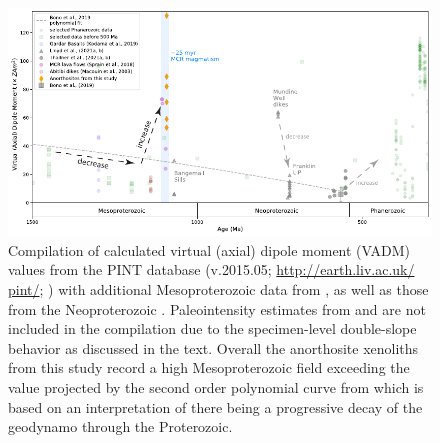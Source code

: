 \documentclass[9pt,twocolumn,twoside,lineno]{pnas-new}
\begin{document}
\begin{figure}[h!]
\noindent\includegraphics[width=17.8 cm]{PINT_compilation.pdf}
\centering
\caption{\footnotesize{Compilation of calculated virtual (axial) dipole moment (VADM) values from the PINT database (v.2015.05; \url{http://earth.liv.ac.uk/ pint/}; \cite{Biggin2015a}) with additional Mesoproterozoic data from \cite{Sprain2018a, Kodama2019a}, as well as those from the Neoproterozoic \cite{Lloyd2021a, Lloyd2021b, Thallner2021a, Thallner2021b}. Paleointensity estimates from \cite{Pesonen1983a} and \cite{Kulakov2013a} are not included in the compilation due to the specimen-level double-slope behavior as discussed in the text. Overall the anorthosite xenoliths from this study record a high Mesoproterozoic field exceeding the value projected by the second order polynomial curve from \cite{Bono2019a} which is based on an interpretation of there being a progressive decay of the geodynamo through the Proterozoic.}}
\label{fig:PINT_compilation}
\end{figure}


\end{document}
